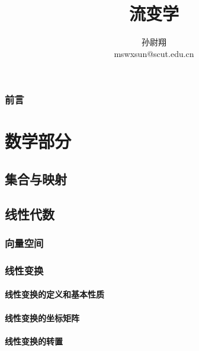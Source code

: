 \documentclass[zihao=-4,linespread=1.5,a4paper,heading=true,twoside]{ctexbook}
\title{流变学}
\author{孙尉翔\\mswxsun@scut.edu.cn}
\theoremstyle{definition}
\theoremstyle{plain}
\begin{document}
\maketitle
{}
\section*{前言}\label{sec:preface}

\tableofcontents

\part{数学部分}
\chapter{集合与映射}\label{sec:II.1}
\label{sec:II.1.1}
\label{sec:II.1.2}
\label{sec:II.1.3}

\chapter{线性代数}\label{sec:II.2}
\section{向量空间}\label{sec:II.2.1}


\section{线性变换}\label{sec:II.2.2}
\subsection{线性变换的定义和基本性质}\label{sec:II.2.2.1}


\subsection{线性变换的坐标矩阵}\label{sec:II.2.2.2}


\subsection{线性变换的转置}\label{sec:II.2.2.3}

\end{document}
